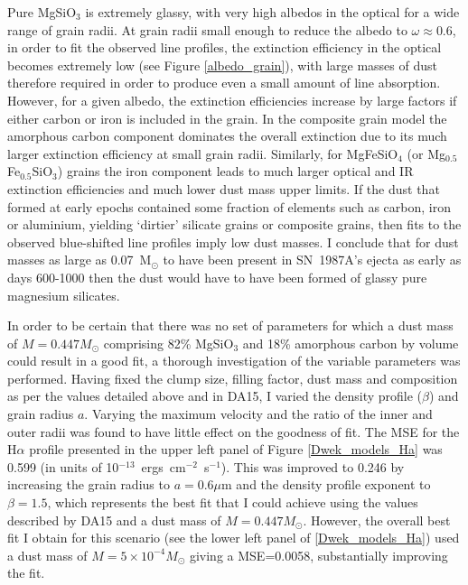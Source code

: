 Pure MgSiO$_3$ is extremely glassy, with very high albedos in the optical 
for a wide range of grain radii.  At grain radii small enough to reduce 
the albedo to $\omega \approx 0.6$, in order to fit the observed line 
profiles, the extinction efficiency in the optical becomes extremely low 
(see Figure \ref{albedo_grain}), with large masses of dust therefore 
required in order to produce even a small amount of line absorption. 
However, for a given albedo, the extinction efficiencies increase by large 
factors if either carbon or iron is included in the grain. In the 
composite grain model the amorphous carbon component dominates the overall 
extinction due to its much larger extinction efficiency at small grain 
radii. Similarly, for MgFeSiO$_4$ (or Mg$_{0.5}$Fe$_{0.5}$SiO$_3$) grains
the iron component leads to much larger optical and IR extinction
efficiencies and much lower dust mass upper limits.
If the dust that formed at early epochs contained some fraction of 
elements such as carbon, iron or aluminium, yielding `dirtier' silicate 
grains or composite grains, then fits to the observed blue-shifted line 
profiles imply low dust masses. I conclude that for dust masses as large
as 0.07~M$_\odot$ to have been present in SN~1987A's ejecta as early as 
days 600-1000 then the dust would have to have been formed of glassy pure 
magnesium silicates.

In order to be certain that there was no set of parameters for which a dust mass of $M=0.447M_{\odot}$ comprising 82\% MgSiO$_3$ and 18\% amorphous carbon by volume could result in a good fit, a thorough investigation of the variable parameters was performed.  Having fixed the clump size, filling factor, dust mass and composition as per the values detailed above and in DA15, I varied the density profile ($\beta$) and grain radius $a$.  Varying the maximum velocity and the ratio of the inner and outer radii was found to have little effect on the goodness of fit.  The MSE for the H$\alpha$ profile presented in the upper left panel of Figure \ref{Dwek_models_Ha} was 0.599 (in units of 10$^{-13}$~ergs~cm$^{-2}$~s$^{-1}$).  This was improved to 0.246 by increasing the grain radius to $a=0.6\mu$m and the density profile exponent to $\beta=1.5$, which represents the best fit that I could achieve using the values described by DA15 and a dust mass of $M=0.447M_{\odot}$.  However, the overall best fit I obtain for this scenario (see the lower left panel of \ref{Dwek_models_Ha}) used a dust mass of $M=5 \times 10^{-4}M_{\odot}$ giving a MSE=0.0058, substantially improving the fit.

